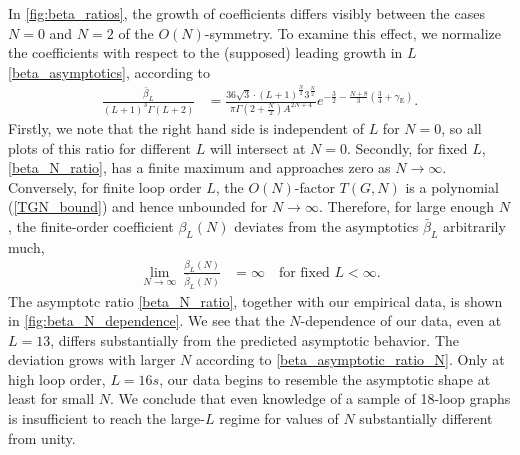 \documentclass[11pt,a4paper]{article}
\renewcommand{\|}{\rule[-0.4ex]{0.2ex}{1.2em}}
\begin{document}
In \cref{fig:beta_ratios}, the growth of coefficients differs visibly between the cases $N=0$ and $N=2$ of the $O(N)$-symmetry.  To examine this effect, we normalize the coefficients with respect to the (supposed) leading growth in $L$ \cref{beta_asymptotics}, according to 
\begin{align}\label{beta_N_ratio}
\frac{\bar \beta_L}{(L+1)^3 \Gamma(L+2)} &=  \frac{36 \sqrt 3\cdot (L+1)^{ \frac{N}{2}}3^{ \frac{N}{2}}  }{\pi   \Gamma \left( 2+\frac{N}{2} \right) A^{2N+4} } e^{-\frac 32 - \frac{N+8}{3}\left( \frac 3 4 + \gamma_\text{E} \right)   } .
\end{align}
Firstly, we note   that the right hand side is independent of $L$ for $N=0$, so all plots of this ratio for different $L$ will intersect at $N=0$.
Secondly, for fixed $L$, \cref{beta_N_ratio}, has a finite maximum and approaches zero as $N\rightarrow\infty$. Conversely, for finite loop order $L$, the $O(N)$-factor $T(G,N)$ is a polynomial (\cref{TGN_bound}) and hence unbounded for $N\rightarrow \infty$. Therefore, for large enough $N$, the finite-order coefficient $\beta_L(N)$  deviates from the asymptotics $\bar \beta_L$ arbitrarily much, 
\begin{align}\label{beta_asymptotic_ratio_N}
\lim_{N \rightarrow \infty} ~\frac{\beta_L(N)}{\bar \beta_L(N)} &= \infty \quad \text{for fixed }L<\infty.
\end{align}
The asymptotc ratio \cref{beta_N_ratio}, together with our empirical data, is shown in \cref{fig:beta_N_dependence}. We see that the $N$-dependence of our data, even at $L=13$, differs  substantially from the predicted asymptotic behavior. The deviation grows with larger $N$ according to \cref{beta_asymptotic_ratio_N}. Only at high loop order, $L=16s$, our data begins to resemble the asymptotic shape at least for small $N$. We conclude that even knowledge of a sample of 18-loop graphs is insufficient to reach the large-$L$ regime for values of $N$ substantially different from unity. 
 
\end{document}
